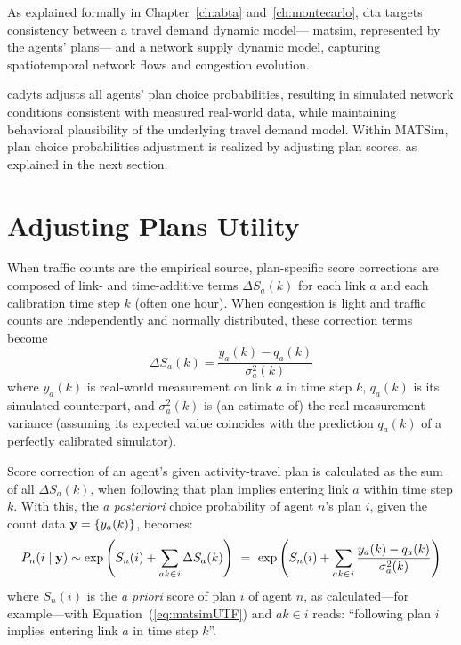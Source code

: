 As explained formally in Chapter~\ref{ch:abta} and~\ref{ch:montecarlo}, 
\gls{dta} targets consistency between a travel demand dynamic model---  
\gls{matsim}, represented by the agents' plans---
and a network supply dynamic model, capturing spatiotemporal
network flows and congestion evolution.

\gls{cadyts} adjusts all agents' plan choice probabilities,
resulting in simulated network conditions consistent with 
measured real-world data, while maintaining behavioral 
plausibility of the underlying travel demand model. 
Within MATSim, plan choice probabilities adjustment is realized 
by adjusting plan scores, as explained in the next section.

\section{Adjusting Plans Utility}

When traffic counts are the empirical source, plan-specific score corrections 
are composed of link- and time-additive terms $\Delta S_a(k)$ for each link $a$
and each calibration time step $k$ (often one hour). 
When congestion is light and traffic counts are independently and normally distributed, 
these correction terms become 
%
\begin{equation}
\label{eq:cadyts:correction}
\Delta S_a(k) = \frac{y_a(k) - q_a(k)} {\sigma_a^2(k)}
\end{equation}
%
where $y_a(k)$ is real-world measurement on link $a$ in time step $k$, 
$q_a(k)$ is its simulated counterpart, and $\sigma^2_a(k)$ is (an estimate of) 
the real measurement variance  (assuming its expected value 
coincides with the prediction $q_a(k)$ of a perfectly calibrated simulator).

Score correction of an agent's given activity-travel plan is calculated as 
the sum of all $\Delta S_a(k)$, when following that plan 
implies entering link $a$ within time step $k$. 
With this, the \textit{a posteriori} choice probability of agent $n$'s plan $i$, given
the count data ${\bf y} = \{y_a(k)\}$, becomes:
%
\begin{equation}
P_n(i\mid{\bf y}) \sim 
\exp\left(S_n(i)+ \sum_{ak\in_{}i} \Delta S_a(k) \right)
\,\,=\,\,
\exp\left(S_n(i)+ \sum_{ak\in_{}i} \frac{y_a(k) - q_a(k)} {\sigma_a^2(k)} \right)
\label{eq:cadyts:selection}
\end{equation}
where $S_n(i)$ is the \textit{a priori} score of plan $i$ of agent $n$, as 
calculated---for example---with Equation~(\ref{eq:matsimUTF}) and $ak\in i$ reads: 
``following plan $i$ implies entering link $a$ in time step $k$''.

